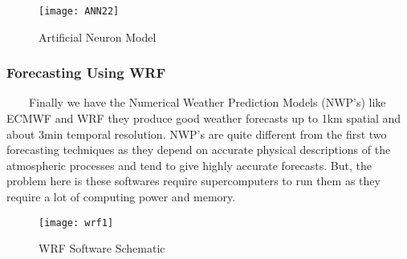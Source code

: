 \begin{figure}[H]
\centering
\texttt{[image: ANN22]}
\caption{Artificial Neuron Model}
\label{figc6h4} %
\end{figure}

\newpage

\subsubsection{Forecasting Using WRF }
\
\
\
\
Finally we have the Numerical Weather Prediction Models (NWP’s) like ECMWF and WRF they produce good weather forecasts up to 1km spatial and about 3min temporal resolution. NWP’s are quite different from the first two forecasting techniques as they depend on accurate physical descriptions of the atmospheric processes and tend to give highly accurate forecasts. But, the problem here is these softwares require supercomputers to run them as they require a lot of computing power and memory.

\begin{figure}[H]
\centering
\texttt{[image: wrf1]}
\caption{WRF Software Schematic}
\label{figc6h5} %
\end{figure}

